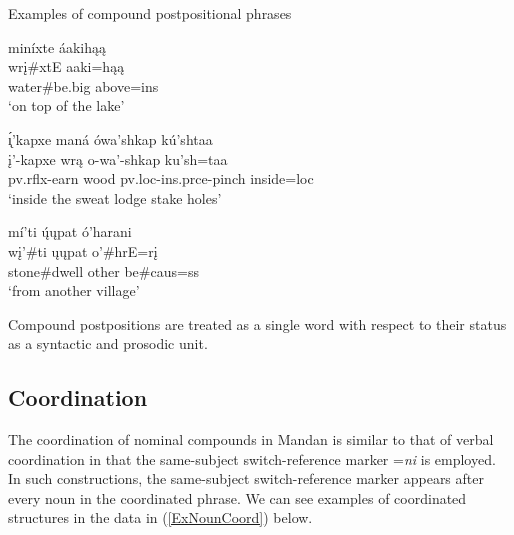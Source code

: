 \begin{exe}

\item\label{Ch5PostpositionalPhrases3} Examples of compound postpositional phrases

    \begin{xlist}
        \item\label{Ch5PostpositionalPhrases3A} \glll miníxte áakihąą\\
        wrį\#xtE aaki=hąą\\
        \textnormal{water}\#\textnormal{be.big} \textnormal{above}=ins\\
        \glt `on top of the lake' \citep[212]{hollow1973a}

        \item\label{Ch5PostpositionalPhrases3B} \glll \'{ı̨}'kapxe maná ówa'shkap kú'shtaa\\
        į'-kapxe wrą o-wa'-shkap ku'sh=taa\\
        pv.rflx-\textnormal{earn} \textnormal{wood} pv.loc-ins.prce-\textnormal{pinch} \textnormal{inside}=loc\\
        \glt `inside the sweat lodge stake holes' \citep[119]{hollow1973a}

        \item\label{Ch5PostpositionalPhrases3C} \glll mí'ti ų́ųpat ó'harani\\
        wį'\#ti ųųpat o'\#hrE=rį\\
        \textnormal{stone}\#\textnormal{dwell} \textnormal{other} \textnormal{be}\#caus=ss\\
        \glt `from another village' \citep[138]{hollow1973b}
    \end{xlist}
\end{exe}

Compound postpositions are treated as a single word with respect to their status as a syntactic and prosodic unit. 

\subsection{Coordination}\label{Ch5NounCoord}

The coordination of nominal compounds in Mandan is similar to that of verbal coordination in that the same-subject switch-reference marker =\textit{ni} is employed. In such constructions, the same-subject switch-reference marker appears after every noun in the coordinated phrase. We can see examples of coordinated structures in the data in (\ref{ExNounCoord}) below.


